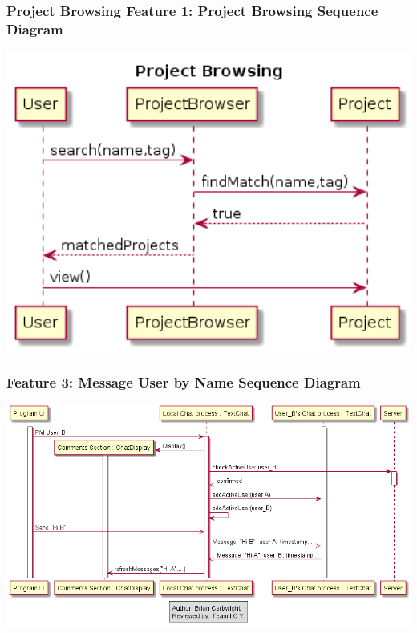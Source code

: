 \documentclass[twoside,letterpaper]{article}
\begin{document}
	\newpage


	\subsubsection[Project Browsing Feature 1: Project Browsing Sequence Diagram]{\rmfamily\bfseries\color{black}
		Project Browsing Feature 1: Project Browsing Sequence Diagram}
	\hypertarget{RefHeading22059017292}{}
	
	\bigskip
	
	\includegraphics[width=6.0in]{images/SequenceDiagrams/ProjectBrowsingProjectBrowsing}
	\label{pb:sd1}
	
	\newpage

	\subsubsection[Communication Feature 3: Message User by Name Sequence Diagram]{\rmfamily\bfseries\color{black}
		Feature 3: Message User by Name Sequence Diagram}
	\hypertarget{RefHeading22059017292}{}
	
	\bigskip
	
	\includegraphics[width=6.0in]{images/SequenceDiagrams/Comms_PM}
	
\end{document}
